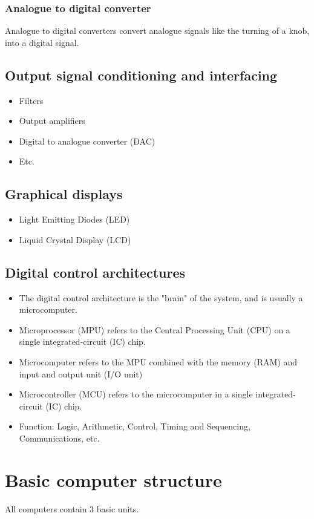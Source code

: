 \documentclass[11pt]{article}
\begin{document}
\subsubsection{Analogue to digital converter}
\label{sec:orgdcfd720}
Analogue to digital converters convert analogue signals like the turning of a knob, into a digital signal.
\subsection{Output signal conditioning and interfacing}
\label{sec:orgcc63428}
\begin{itemize}
\item Filters
\item Output amplifiers
\item Digital to analogue converter (DAC)
\item Etc.
\end{itemize}
\subsection{Graphical displays}
\label{sec:org285328a}
\begin{itemize}
\item Light Emitting Diodes (LED)
\item Liquid Crystal Display (LCD)
\end{itemize}

 \newpage
\subsection{Digital control architectures}
\label{sec:org19772a7}
\begin{itemize}
\item The digital control architecture is the "brain" of the system, and is usually a microcomputer.
\item Microprocessor (MPU) refers to the Central Processing Unit (CPU) on a single integrated-circuit (IC) chip.
\item Microcomputer refers to the MPU combined with the memory (RAM) and input and output unit (I/O unit)
\item Microcontroller (MCU) refers to the microcomputer in a single integrated-circuit (IC) chip.
\item Function: Logic, Arithmetic, Control, Timing and Sequencing, Communications, etc.
\end{itemize}

 \newpage
\section{Basic computer structure}
\label{sec:orgdcd44da}
All computers contain 3 basic units.
\end{document}

